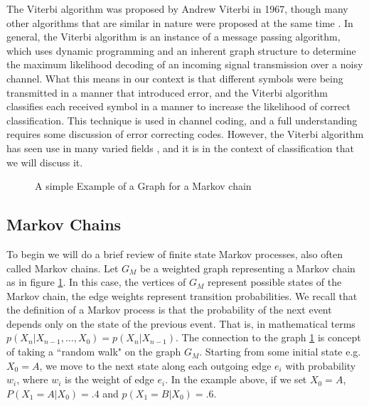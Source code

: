 The Viterbi algorithm was proposed by Andrew Viterbi in 1967, though many other algorithms that are similar in nature were proposed at the same time \cite{ForneyVPH,ViterbiPH}.  In general, the Viterbi algorithm is an instance of a message passing algorithm, which uses dynamic programming and an inherent graph structure to determine the maximum likelihood decoding of an incoming signal transmission over a noisy channel.  What this means in our context is that different symbols were being transmitted in a manner that introduced error, and the Viterbi algorithm classifies each received symbol in a manner to increase the likelihood of correct classification.  This technique is used in channel coding, and a full understanding requires some discussion of error correcting codes.  However, the Viterbi algorithm has seen use in many varied fields \cite{ViterbiPH}, and it is in the context of classification that we will discuss it.

\begin{figure}[h]
\caption{A simple Example of a Graph for a Markov chain}\label{markovGraph}
\end{figure}
\subsection{Markov Chains}
To begin we will do a brief review of finite state Markov processes, also often called Markov chains. Let $G_M$ be a weighted graph representing a Markov chain as in figure \ref{markovGraph}. In this case, the vertices of $G_M$ represent possible states of the Markov chain, the edge weights represent transition probabilities.  
We recall that the definition of a Markov process is that the probability of the next event depends only on the state of the previous event.  That is, in mathematical terms $p(X_n|X_{n-1},\ldots,X_0)=p(X_n|X_{n-1})$. The connection to the graph \ref{markovGraph} is concept of taking a ``random walk" on the graph $G_M$.  Starting from some initial state e.g. $X_0=A$, we move to the next state along each outgoing edge $e_i$ with probability $w_i$, where $w_i$ is the weight of edge $e_i$.  In the example above, if we set $X_0=A$, $P(X_1=A|X_0)=.4$ and $p(X_1=B|X_0)=.6$.
 
